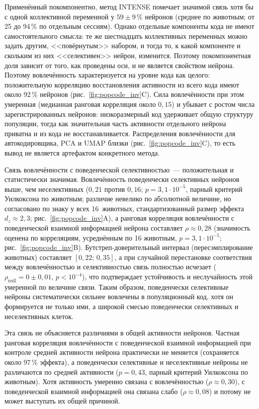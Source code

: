 Применённый покомпонентно, метод INTENSE помечает значимой связь хотя бы с одной коллективной переменной у $59 \pm 9\,\%$ нейронов (среднее по животным; от 25 до 94\,\% по отдельным сессиям). Однако отдельные компоненты кода не имеют самостоятельного смысла: те же шестнадцать коллективных переменных можно задать другим, <<повёрнутым>> набором, и тогда то, к какой компоненте и скольким из них <<селективен>> нейрон, изменится. Поэтому покомпонентная доля зависит от того, как проведены оси, и не является свойством нейрона. Поэтому вовлечённость характеризуется на уровне кода как целого: положительную корреляцию восстановления активности из всего кода имеют около 92\,\% нейронов (рис.~\ref{fig:popcode_inv}C). Сила вовлечённости при этом умеренная (медианная ранговая корреляция около $0{,}15$) и убывает с ростом числа зарегистрированных нейронов: низкоразмерный код удерживает общую структуру популяции, тогда как значительная часть активности отдельного нейрона приватна и из кода не восстанавливается. Распределения вовлечённости для автокодировщика, PCA и UMAP близки (рис.~\ref{fig:popcode_inv}C), то есть вывод не является артефактом конкретного метода.

Связь вовлечённости с поведенческой селективностью~--- положительная и статистически значимая. Вовлечённость поведенчески селективных нейронов выше, чем неселективных ($0{,}21$ против $0{,}16$; $p = 3{,}1\cdot10^{-5}$, парный критерий Уилкоксона по животным; различие невелико по абсолютной величине, но согласовано по знаку у всех 16~животных, стандартизованный размер эффекта $d_z \approx 2{,}3$; рис.~\ref{fig:popcode_inv}A), а ранговая корреляция вовлечённости с поведенческой взаимной информацией нейрона составляет $\rho \approx 0{,}28$ (значимость оценена по корреляциям, усреднённым по 16 животным, $p = 3{,}1\cdot10^{-5}$; рис.~\ref{fig:popcode_inv}B). Бутстреп-доверительный интервал (пересэмплирование животных) составляет $[0{,}22;\,0{,}35]$, а при случайной перестановке соответствия между вовлечённостью и селективностью связь полностью исчезает ($\rho_{\text{null}} = 0 \pm 0{,}01$, $p < 10^{-4}$), что подтверждает устойчивость и неслучайность этой умеренной по величине связи. Таким образом, поведенчески селективные нейроны систематически сильнее вовлечены в популяционный код, хотя он формируется не только ими, а широкой смесью поведенчески селективных и неселективных клеток.

Эта связь не объясняется различиями в общей активности нейронов. Частная ранговая корреляция вовлечённости с поведенческой взаимной информацией при контроле средней активности нейрона практически не меняется (сохраняется около 97\,\% эффекта), а поведенчески селективные и неселективные нейроны не различаются по средней активности ($p = 0{,}43$, парный критерий Уилкоксона по животным). Хотя активность умеренно связана с вовлечённостью ($\rho \approx 0{,}30$), с поведенческой взаимной информацией она связана слабо ($\rho \approx 0{,}08$) и потому не может выступать их общей причиной.

